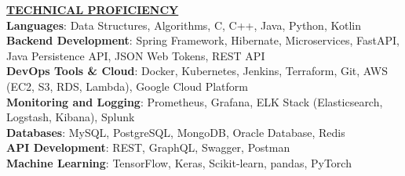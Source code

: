 \documentclass{article}
\begin{document}
\noindent \textbf{\underline{TECHNICAL PROFICIENCY}} \\
\textbf{Languages}{: \small Data Structures, Algorithms, C, C++, Java, Python, Kotlin} \\
\textbf{Backend Development}{: \small Spring Framework, Hibernate, Microservices, FastAPI, Java Persistence API, JSON Web Tokens, REST API} \\
\textbf{DevOps Tools \& Cloud}{: \small Docker, Kubernetes, Jenkins, Terraform, Git, AWS (EC2, S3, RDS, Lambda), Google Cloud Platform} \\
\textbf{Monitoring and Logging}{: \small Prometheus, Grafana, ELK Stack (Elasticsearch, Logstash, Kibana), Splunk} \\
\textbf{Databases}{: \small MySQL, PostgreSQL, MongoDB, Oracle Database, Redis} \\
\textbf{API Development}{: \small REST, GraphQL, Swagger, Postman} \\
\textbf{Machine Learning}{: \small TensorFlow, Keras, Scikit-learn, pandas, PyTorch} \\


\end{document}

